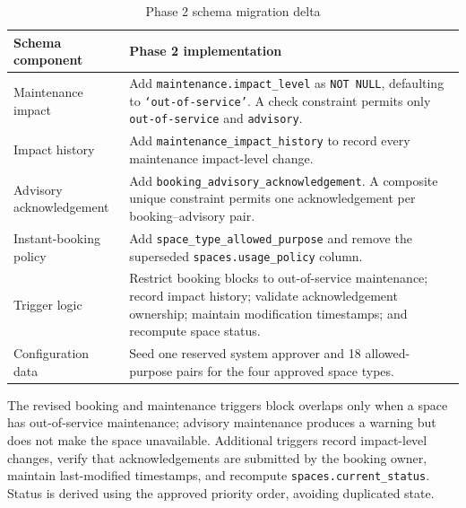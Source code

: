 \begin{table}[htbp]
    \centering
    \small
    \renewcommand{\arraystretch}{1.15}
    \begin{tabularx}{\textwidth}{>{\RaggedRight\arraybackslash}p{}
                                  >{\RaggedRight\arraybackslash}X}
        \toprule
        \textbf{Schema component} & \textbf{Phase 2 implementation} \\
        \midrule
        Maintenance impact &
        Add \texttt{maintenance.impact\_level} as \texttt{NOT NULL}, defaulting
        to \texttt{`out-of-service'}. A check constraint permits only
        \texttt{out-of-service} and \texttt{advisory}. \\
        \midrule
        Impact history &
        Add \texttt{maintenance\_impact\_history} to record every maintenance
        impact-level change. \\
        \midrule
        Advisory acknowledgement &
        Add \texttt{booking\_advisory\_acknowledgement}. A composite unique
        constraint permits one acknowledgement per booking--advisory pair. \\
        \midrule
        Instant-booking policy &
        Add \texttt{space\_type\_allowed\_purpose} and remove the superseded
        \texttt{spaces.usage\_policy} column. \\
        \midrule
        Trigger logic &
        Restrict booking blocks to out-of-service maintenance; record impact
        history; validate acknowledgement ownership; maintain modification
        timestamps; and recompute space status. \\
        \midrule
        Configuration data &
        Seed one reserved system approver and 18 allowed-purpose pairs for the
        four approved space types. \\
        \bottomrule
    \end{tabularx}
    \caption{Phase 2 schema migration delta}
    \label{tab:migration-delta}
\end{table}
\FloatBarrier

The revised booking and maintenance triggers block overlaps only when a space
has out-of-service maintenance; advisory maintenance produces a warning but
does not make the space unavailable. Additional triggers record impact-level
changes, verify that acknowledgements are submitted by the booking owner,
maintain last-modified timestamps, and recompute
\texttt{spaces.current\_status}. Status is derived using the approved priority
order, avoiding duplicated state.

